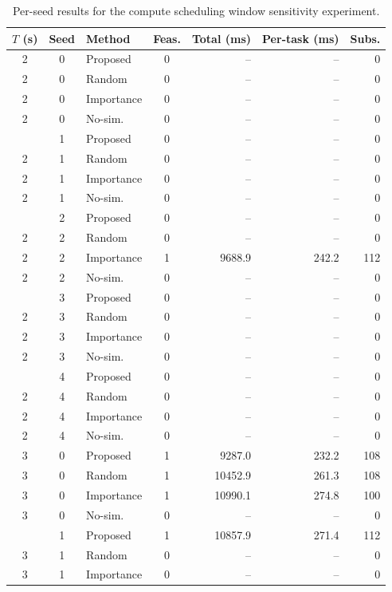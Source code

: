 \begin{table}[t]
\centering
\caption{Per-seed results for the compute scheduling window sensitivity experiment.}
\label{tab:compute_window_detail}
\setlength{\tabcolsep}{3.8pt}
\begin{tabular}{cc l c r r r}
\toprule
$T$ (s) & Seed & Method & Feas. & Total (ms) & Per-task (ms) & Subs. \\
\midrule
2 & 0 & Proposed & 0 & -- & -- & 0 \\
2 & 0 & Random & 0 & -- & -- & 0 \\
2 & 0 & Importance & 0 & -- & -- & 0 \\
2 & 0 & No-sim. & 0 & -- & -- & 0 \\
\addlinespace[1pt]
2 & 1 & Proposed & 0 & -- & -- & 0 \\
2 & 1 & Random & 0 & -- & -- & 0 \\
2 & 1 & Importance & 0 & -- & -- & 0 \\
2 & 1 & No-sim. & 0 & -- & -- & 0 \\
\addlinespace[1pt]
2 & 2 & Proposed & 0 & -- & -- & 0 \\
2 & 2 & Random & 0 & -- & -- & 0 \\
2 & 2 & Importance & 1 & 9688.9 & 242.2 & 112 \\
2 & 2 & No-sim. & 0 & -- & -- & 0 \\
\addlinespace[1pt]
2 & 3 & Proposed & 0 & -- & -- & 0 \\
2 & 3 & Random & 0 & -- & -- & 0 \\
2 & 3 & Importance & 0 & -- & -- & 0 \\
2 & 3 & No-sim. & 0 & -- & -- & 0 \\
\addlinespace[1pt]
2 & 4 & Proposed & 0 & -- & -- & 0 \\
2 & 4 & Random & 0 & -- & -- & 0 \\
2 & 4 & Importance & 0 & -- & -- & 0 \\
2 & 4 & No-sim. & 0 & -- & -- & 0 \\
\midrule
3 & 0 & Proposed & 1 & 9287.0 & 232.2 & 108 \\
3 & 0 & Random & 1 & 10452.9 & 261.3 & 108 \\
3 & 0 & Importance & 1 & 10990.1 & 274.8 & 100 \\
3 & 0 & No-sim. & 0 & -- & -- & 0 \\
\addlinespace[1pt]
3 & 1 & Proposed & 1 & 10857.9 & 271.4 & 112 \\
3 & 1 & Random & 0 & -- & -- & 0 \\
3 & 1 & Importance & 0 & -- & -- & 0 \\

\end{tabular}
\end{table}
